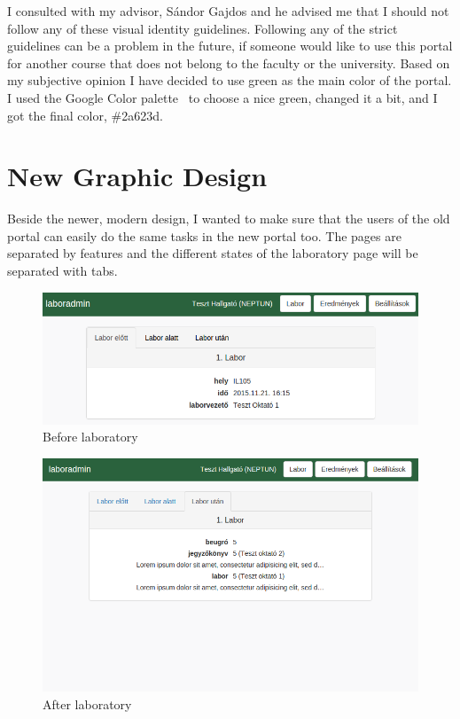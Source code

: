I consulted with my advisor, Sándor Gajdos and he advised me that I should not follow any of these visual identity guidelines. Following any of the strict guidelines can be a problem in the future, if someone would like to use this portal for another course that does not belong to the faculty or the university. Based on my subjective opinion I have decided to use green as the main color of the portal. I used the Google Color palette~\cite{google-color-chart} to choose a nice green, changed it a bit, and I got the final color, \#2a623d.

\newpage
\section{New Graphic Design}

Beside the newer, modern design, I wanted to make sure that the users of the old portal can easily do the same tasks in the new portal too. The pages are separated by features and the different states of the laboratory page will be separated with tabs.

\begin{figure}[!ht]
	\includegraphics[width=\textwidth]{figures/design/labor_elott.png}
	\caption{Before laboratory}
	\label{fig:before}
\end{figure}




\begin{figure}[!ht]
	\includegraphics[width=\textwidth]{figures/design/labor_utan.png}
	\caption{After laboratory}
	\label{fig:after}
\end{figure}


